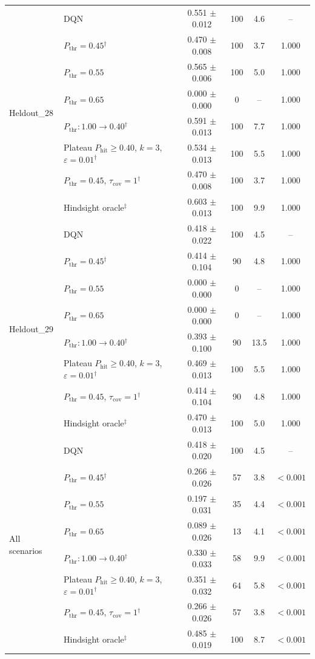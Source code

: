 \begin{table}[htbp]
\begin{tabular}{llcccc}
\multirow{8}{*}{Heldout\_28} & DQN & 0.551 $\pm$ 0.012 & 100 & 4.6 & -- \\
 & $P_{\mathrm{thr}}=0.45$$^{\dagger}$ & 0.470 $\pm$ 0.008 & 100 & 3.7 & 1.000 \\
 & $P_{\mathrm{thr}}=0.55$ & 0.565 $\pm$ 0.006 & 100 & 5.0 & 1.000 \\
 & $P_{\mathrm{thr}}=0.65$ & 0.000 $\pm$ 0.000 & 0 & -- & 1.000 \\
 & $P_{\mathrm{thr}}: 1.00 \to 0.40$$^{\dagger}$ & 0.591 $\pm$ 0.013 & 100 & 7.7 & 1.000 \\
 & Plateau $P_{\mathrm{hit}}\geq0.40$, $k=3$, $\varepsilon=0.01$$^{\dagger}$ & 0.534 $\pm$ 0.013 & 100 & 5.5 & 1.000 \\
 & $P_{\mathrm{thr}}=0.45$, $\tau_{\mathrm{cov}}=1$$^{\dagger}$ & 0.470 $\pm$ 0.008 & 100 & 3.7 & 1.000 \\
 & Hindsight oracle$^{\ddagger}$ & 0.603 $\pm$ 0.013 & 100 & 9.9 & 1.000 \\
\midrule
\multirow{8}{*}{Heldout\_29} & DQN & 0.418 $\pm$ 0.022 & 100 & 4.5 & -- \\
 & $P_{\mathrm{thr}}=0.45$$^{\dagger}$ & 0.414 $\pm$ 0.104 & 90 & 4.8 & 1.000 \\
 & $P_{\mathrm{thr}}=0.55$ & 0.000 $\pm$ 0.000 & 0 & -- & 1.000 \\
 & $P_{\mathrm{thr}}=0.65$ & 0.000 $\pm$ 0.000 & 0 & -- & 1.000 \\
 & $P_{\mathrm{thr}}: 1.00 \to 0.40$$^{\dagger}$ & 0.393 $\pm$ 0.100 & 90 & 13.5 & 1.000 \\
 & Plateau $P_{\mathrm{hit}}\geq0.40$, $k=3$, $\varepsilon=0.01$$^{\dagger}$ & 0.469 $\pm$ 0.013 & 100 & 5.5 & 1.000 \\
 & $P_{\mathrm{thr}}=0.45$, $\tau_{\mathrm{cov}}=1$$^{\dagger}$ & 0.414 $\pm$ 0.104 & 90 & 4.8 & 1.000 \\
 & Hindsight oracle$^{\ddagger}$ & 0.470 $\pm$ 0.013 & 100 & 5.0 & 1.000 \\
\midrule
\multirow{8}{*}{All scenarios} & DQN & 0.418 $\pm$ 0.020 & 100 & 4.5 & -- \\
 & $P_{\mathrm{thr}}=0.45$$^{\dagger}$ & 0.266 $\pm$ 0.026 & 57 & 3.8 & $<0.001$ \\
 & $P_{\mathrm{thr}}=0.55$ & 0.197 $\pm$ 0.031 & 35 & 4.4 & $<0.001$ \\
 & $P_{\mathrm{thr}}=0.65$ & 0.089 $\pm$ 0.026 & 13 & 4.1 & $<0.001$ \\
 & $P_{\mathrm{thr}}: 1.00 \to 0.40$$^{\dagger}$ & 0.330 $\pm$ 0.033 & 58 & 9.9 & $<0.001$ \\
 & Plateau $P_{\mathrm{hit}}\geq0.40$, $k=3$, $\varepsilon=0.01$$^{\dagger}$ & 0.351 $\pm$ 0.032 & 64 & 5.8 & $<0.001$ \\
 & $P_{\mathrm{thr}}=0.45$, $\tau_{\mathrm{cov}}=1$$^{\dagger}$ & 0.266 $\pm$ 0.026 & 57 & 3.8 & $<0.001$ \\
 & Hindsight oracle$^{\ddagger}$ & 0.485 $\pm$ 0.019 & 100 & 8.7 & $<0.001$ \\
\bottomrule
\end{tabular}
\end{table}
